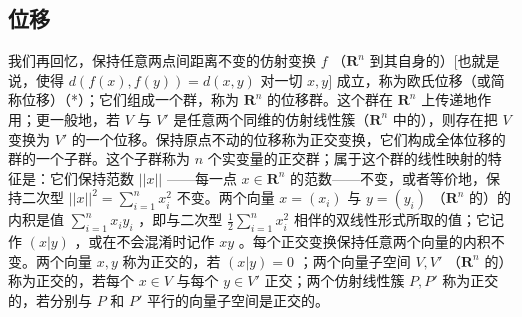 \subsection{位移}

我们再回忆，保持任意两点间距离不变的仿射变换 \(f\) （\(\mathbf{R}^n\) 到其自身的）{[}也就是说，使得 \(d(f(x), f(y)) = d(x, y)\) 对一切 \(x, y]\) 成立，称为欧氏位移（或简称位移）（*）；它们组成一个群，称为 \(\mathbf{R}^n\) 的位移群。这个群在 \(\mathbf{R}^n\) 上传递地作用；更一般地，若 \(V\) 与 \(V'\) 是任意两个同维的仿射线性簇（\(\mathbf{R}^n\) 中的），则存在把 \(V\) 变换为 \(V'\) 的一个位移。保持原点不动的位移称为正交变换，它们构成全体位移的群的一个子群。这个子群称为 \(n\) 个实变量的正交群；属于这个群的线性映射的特征是：它们保持范数 \(||x||\) ——每一点 \(x \in \mathbf{R}^n\) 的范数——不变，或者等价地，保持二次型 \(||x||^2 = \sum_{i=1}^{n} x_i^2\) 不变。两个向量 \(x = (x_i)\) 与 \(y = (y_i)\) （\(\mathbf{R}^n\) 的）的内积是值 \(\sum_{i=1}^{n} x_i y_i\) ，即与二次型 \(\frac{1}{2} \sum_{i=1}^{n} x_i^2\) 相伴的双线性形式所取的值；它记作 \((x|y)\) ，或在不会混淆时记作 \(xy\) 。每个正交变换保持任意两个向量的内积不变。两个向量 \(x, y\) 称为正交的，若 \((x|y) = 0\) ；两个向量子空间 \(V, V'\) （\(\mathbf{R}^n\) 的）称为正交的，若每个 \(x \in V\) 与每个 \(y \in V'\) 正交；两个仿射线性簇 \(P, P'\) 称为正交的，若分别与 \(P\) 和 \(P'\) 平行的向量子空间是正交的。

